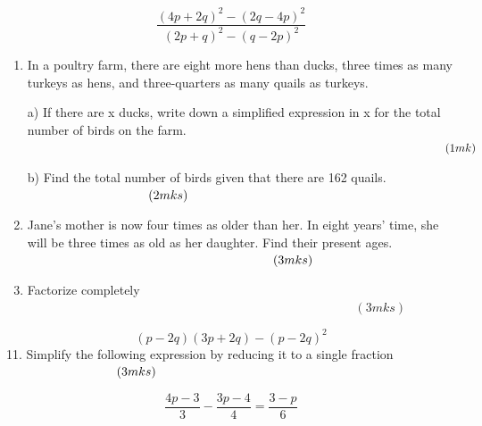 \documentclass[
  letterpaper,
  DIV=11,
  numbers=noendperiod]{scrreprt}
\begin{document}
\begin{tcolorbox}
\[\frac{(4p+2q)^2-(2q-4p)^2}{(2p+q)^2-(q-2p)^2} \]

\begin{enumerate}
\def\labelenumi{\arabic{enumi}.}
\setcounter{enumi}{7}
\item
  In a poultry farm, there are eight more hens than ducks, three times
  as many turkeys as hens, and three-quarters as many quails as turkeys.

  a) If there are x ducks, write down a simplified expression in x for
  the total number of birds on the farm. \(\hspace{12.9cm}(1mk)\)

  b) Find the total number of birds given that there are 162 quails.
  \(\hspace{3.4cm}(2mks)\)
\item
  Jane's mother is now four times as older than her. In eight years'
  time, she will be three times as old as her daughter. Find their
  present ages. \(\hspace{6.9cm} (3mks)\)
\item
  Factorize completely \(\hspace{11cm} (3mks)\)
\end{enumerate}

\[
(p-2q)(3p+2q)-(p-2q)^2
\] 11. Simplify the following expression by reducing it to a single
fraction \(\hspace{3.1cm} (3 mks)\)

\[
\frac{4p-3}{3}-\frac{3p-4}{4}=\frac{3-p}{6}
\]


\end{tcolorbox}
\end{document}
